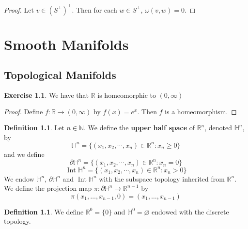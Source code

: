\documentclass{book}
\theoremstyle{definition}
\newtheorem{defn}[definition]{Definition}
\newtheorem{ex}[definition]{Exercise}
\newcommand{\om}{\omega}
\renewcommand{\H}{\mathbb{H}}
\newcommand{\N}{\mathbb{N}}
\newcommand{\R}{\mathbb{R}}
\DeclareMathOperator{\Int}{Int}
\DeclareMathOperator*{\0}{\mbf{0}}
\DeclareMathOperator*{\1}{\mbf{1}}
\newcommand{\tbf}[1]{\textbf{#1}}
\newcommand{\p}{\partial}
\begin{document}
	\begin{proof}
		Let $v \in (S^{\perp})^{\perp}$. Then for each $w \in S^{\perp}$, $\om(v, w) = 0$. 
	\end{proof}
	
	
	
	
	
	
	
	
	
	
	
	
	
	
	
	
	
	
	
	
	
	
	
	
	
	
	
	
	
	
	
	
	

	\newpage
	
	\chapter{Smooth Manifolds}
	
	\section{Topological Manifolds}
	
	\begin{ex}
		We have that $\R$ is homeomorphic to $(0, \infty)$
	\end{ex}

	\begin{proof}
		Define $f: \R \rightarrow (0,\infty)$ by $f(x) = e^x$. Then $f$ is a homeomorphism.
	\end{proof}
	
	\begin{defn}
		Let $n \in \N$. We define the \tbf{upper half space} of $\R^n$, denoted $\H^n$, by $$\H^n = \{(x_1, x_2, \cdots, x_n) \in \R^n: x_n \geq 0\}$$ and we define $$\partial\H^n = \{(x_1, x_2, \cdots, x_n) \in \R^n: x_n = 0\}$$ 
		$$\Int \H^n = \{(x_1, x_2, \cdots, x_n) \in \R^n: x_n > 0\}$$
		We endow $\H^n$, $\p \H^n$ and $\Int \H^n $ with the subspace topology inherited from $\R^n$.\\
		We define the projection map $\pi: \p \H^n \rightarrow \R^{n-1}$ by 
		$$\pi(x_1, \ldots, x_{n-1}, 0) = (x_1, \ldots, x_{n-1})$$
	\end{defn}

	\begin{defn}
		We define $\R^0 = \{0\}$ and $\H^0 = \varnothing$ endowed with the discrete topology.
	\end{defn}
	
\end{document}
